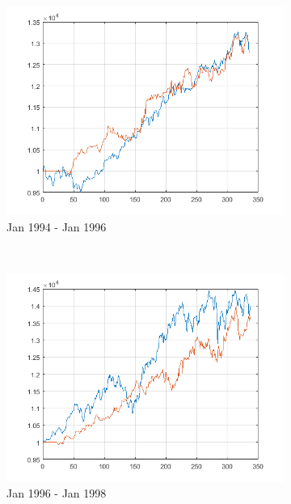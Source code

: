 \documentclass[11pt,a4,twosided,singlespacing,titlepagenumber=on]{scrreprt}
\numberwithin{equation}{chapter} %
\theoremstyle{remark}
\begin{document}
\begin{figure}[H]
\begin{subfigure}[t]{0.32\textwidth}
        \includegraphics[width=1\textwidth]{res/backtest_cpx/3}
        \caption{Jan 1994 - Jan 1996}
    \end{subfigure} \\
    \begin{subfigure}[t]{0.32\textwidth}
        \centering
        \includegraphics[width=1\textwidth]{res/backtest_cpx/4}
        \caption{Jan 1996 - Jan 1998}
    \end{subfigure}
    \begin{subfigure}[t]{0.32\textwidth}
        \centering

\end{subfigure}
\end{figure}
\end{document}
